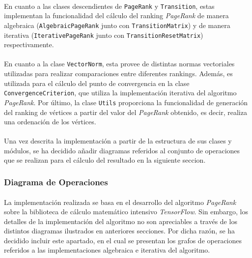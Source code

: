\documentclass{subfiles}
\begin{document}
          \paragraph{}
          En cuanto a las clases descendientes de \texttt{PageRank} y \texttt{Transition}, estas implementan la funcionalidad del cálculo del ranking \emph{PageRank} de manera algebraica (\texttt{AlgebraicPageRank} junto con \texttt{TransitionMatrix}) y de manera iterativa (\texttt{IterativePageRank} junto con \texttt{TransitionResetMatrix}) respectivamente.

          \paragraph{}
          En cuanto a la clase \texttt{VectorNorm}, esta provee de distintas normas vectoriales utilizadas para realizar comparaciones entre diferentes rankings. Además, es utilizada para el cálculo del punto de convergencia en la clase \texttt{ConvergenceCriterion}, que utiliza la implementación iterativa del algoritmo \emph{PageRank}. Por último, la clase \texttt{Utils} proporciona la funcionalidad de generación del ranking de vértices a partir del valor del \emph{PageRank} obtenido, es decir, realiza una ordenación de los vértices.

          \paragraph{}
          Una vez descrita la implementación a partir de la estructura de sus clases y módulos, se ha decidido añadir diagramas referidos al conjunto de operaciones que se realizan para el cálculo del resultado en la siguiente seccion.

        \subsubsection{Diagrama de Operaciones}
        \label{sec:operations_diagram}

          \paragraph{}
          La implementación realizada se basa en el desarrollo del algoritmo \emph{PageRank} sobre la biblioteca de cálculo matemático intensivo \emph{TensorFlow}. Sin embargo, los detalles de la implementación del algoritmo no son apreciables a través de los distintos diagramas ilustrados en anteriores secciones. Por dicha razón, se ha decidido incluir este apartado, en el cual se presentan los grafos de operaciones referidos a las implementaciones algebraica e iterativa del algoritmo.
\end{document}
